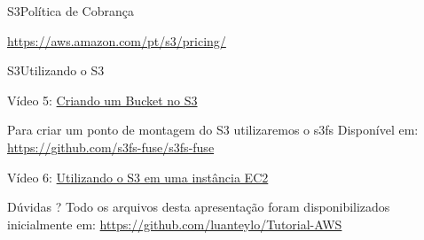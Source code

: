\documentclass[xcolor=table]{beamer}
\begin{document}
\begin{frame}[c]{S3}{Política de Cobrança}
    \begin{outline}
        \1[]\url{https://aws.amazon.com/pt/s3/pricing/}
    \end{outline}
        
            
    \begin{center}
    \end{center}           
       
\end{frame}


\begin{frame}[c]{S3}{Utilizando o S3}

        
        \begin{center}
            Vídeo 5: \href{run:./5_s3.ogv}{Criando um Bucket no S3}
        \end{center}       
       
        
            \begin{outline}
                \1 Para criar um ponto de montagem do S3 utilizaremos o s3fs
                \2 Disponível em: \url{https://github.com/s3fs-fuse/s3fs-fuse}
            \end{outline}
        
        \begin{center}
            Vídeo 6: \href{run:./6_mountS3.ogv}{Utilizando o S3 em uma instância EC2}
        \end{center}       
       
\end{frame}

{
\begin{frame}[c]{}

    \begin{center}

 
            Dúvidas ?
            \vskip 0.5cm
            Todo os arquivos desta apresentação foram disponibilizados inicialmente em: \url{https://github.com/luanteylo/Tutorial-AWS}
             
      
         
    \end{center}
     
       
\end{frame}
}
\end{document}
